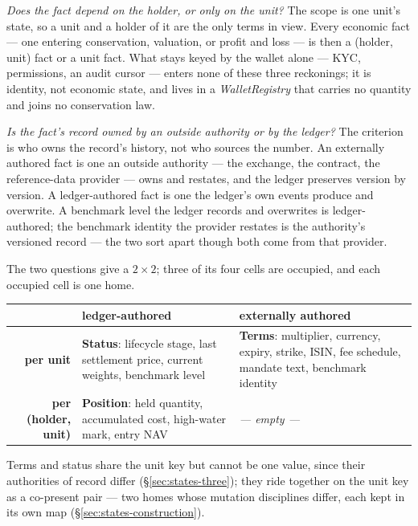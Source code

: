 \documentclass[11pt,a4paper]{article}
\begin{document}
\emph{Does the fact depend on the holder, or only on the unit?} The scope is one unit's
state, so a unit and a holder of it are the only terms in view. Every economic fact ---
one entering conservation, valuation, or profit and loss --- is then a (holder, unit)
fact or a unit fact. What stays keyed by the wallet alone --- KYC, permissions, an audit
cursor --- enters none of these three reckonings; it is identity, not economic state, and
lives in a \emph{WalletRegistry} that carries no quantity and joins no conservation law.

\emph{Is the fact's record owned by an outside authority or by the ledger?} The criterion
is who owns the record's history, not who sources the number. An externally authored fact
is one an outside authority --- the exchange, the contract, the reference-data provider
--- owns and restates, and the ledger preserves version by version. A ledger-authored
fact is one the ledger's own events produce and overwrite. A benchmark level the ledger
records and overwrites is ledger-authored; the benchmark identity the provider restates is
the authority's versioned record --- the two sort apart though both come from that
provider.

The two questions give a $2\times2$; three of its four cells are occupied, and each
occupied cell is one home.

\begin{center}
\begin{tabular}{@{}r p{} p{}@{}}
\toprule
 & \textbf{ledger-authored} & \textbf{externally authored} \\
\midrule
\textbf{per unit} & \textbf{Status}: lifecycle stage, last settlement price, current
weights, benchmark level & \textbf{Terms}: multiplier, currency, expiry, strike, ISIN,
fee schedule, mandate text, benchmark identity \\
\addlinespace
\textbf{per (holder, unit)} & \textbf{Position}: held quantity, accumulated cost,
high-water mark, entry NAV & \textit{--- empty ---} \\
\bottomrule
\end{tabular}
\end{center}

Terms and status share the unit key but cannot be one value, since their authorities of
record differ (\S\ref{sec:states-three}); they ride together on the unit key as a
co-present pair --- two homes whose mutation disciplines differ, each kept in its own map
(\S\ref{sec:states-construction}).
\end{document}
